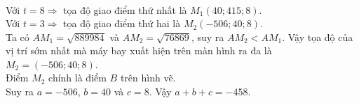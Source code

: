 \begin{ex}
{\begin{eqnarray*}
			\end{eqnarray*}
			Với $t=8 \Rightarrow $ tọa độ giao điểm thứ nhất là $M_1 (40;415;8)$.\\
			Với $t=3 \Rightarrow $ tọa độ giao điểm thứ hai là $M_2 (-506; 40;8)$.\\
			Ta có $AM_1 = \sqrt{889984}$ và $AM_2 = \sqrt{76869}$, suy ra $AM_2 < AM_1$. Vậy tọa độ của vị trí sớm nhất mà máy bay xuất hiện trên màn hình ra đa là $M_2=(-506;40;8)$.\\
			Điểm $M_2$ chính là điểm $B$ trên hình vẽ.\\
			Suy ra $a=-506$, $b=40$ và $c=8$. Vậy $a+b+c=-458$.
	}
\end{ex}
